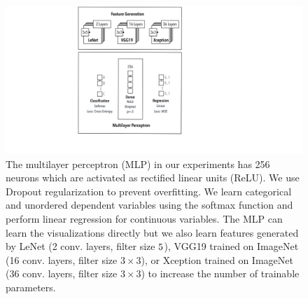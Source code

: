 \documentclass[journal]{vgtc}                %
\begin{document}
\begin{table}[t]
\centering
\caption{We use different feature generators as input to a multilayer perceptron which performs linear regression or the classification task. This yields different sets of trainable parameters. We also train the MLP directly on the visualizations without any additional feature generation.}
\label{tab:parameters}
\vspace{-4mm}
\end{table}

\begin{figure}[t]
	\centering
	  \includegraphics[width=.8\linewidth]{classifiers.pdf}
  \caption{The multilayer perceptron (MLP) in our experiments has 256 neurons which are activated as rectified linear units (ReLU). We use Dropout regularization to prevent overfitting. We learn categorical and unordered dependent variables using the softmax function and perform linear regression for continuous variables. The MLP can learn the visualizations directly but we also learn features generated by LeNet (2 conv. layers, filter size $5\time5$), VGG19 trained on ImageNet (16 conv. layers, filter size $3\times3$), or Xception trained on ImageNet (36 conv. layers, filter size $3\times3$) to increase the number of trainable parameters.}
	\label{fig:classifiers}
\end{figure}
\end{document}
